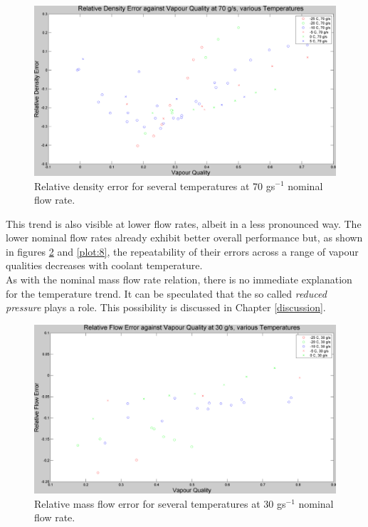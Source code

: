 \documentclass{report}
\begin{document}
\begin{figure}
\includegraphics[width=\textwidth]{plots/fig6}
\caption{Relative density error for several temperatures at 70 gs$^{-1}$ nominal flow rate.}
\label{plot:6}
\end{figure}
This trend is also visible at lower flow rates, albeit in a less pronounced way. The lower nominal flow rates already exhibit better overall performance  but, as shown in figures \ref{plot:7} and \ref{plot:8}, the repeatability of their errors across a range of vapour qualities decreases with coolant temperature.\\
As with the nominal mass flow rate relation, there is no immediate explanation for the temperature trend. It can be speculated that the so called \textit{reduced pressure} plays a role. This possibility is discussed in Chapter \ref{discussion}. 
\begin{figure}
\includegraphics[width=\textwidth]{plots/fig7}
\caption{Relative mass flow error for several temperatures at 30 gs$^{-1}$ nominal flow rate.}
\label{plot:7}
\end{figure}
\end{document}
